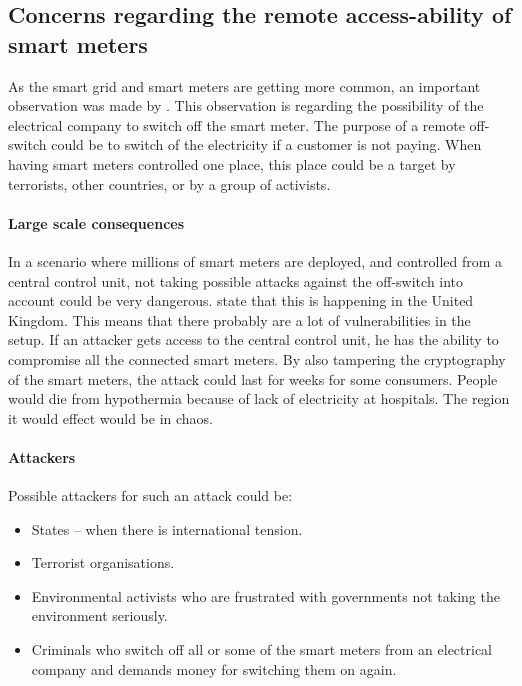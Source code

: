 
\subsection{Concerns regarding the remote access-ability of smart meters}\label{off_switch}
As the smart grid and smart meters are getting more common, an important observation was made by \citet{offswitch}.
This observation is regarding the possibility of the electrical company to switch off the smart meter.
The purpose of a remote off-switch could be to switch of the electricity if a customer is not paying.
When having smart meters controlled one place, this place could be a target by terrorists, other countries, or by a group of activists. 

\paragraph{Large scale consequences}
In a scenario where millions of smart meters are deployed, and controlled from a central control unit, not taking possible attacks against the off-switch into account could be very dangerous.
\citet{offswitch} state that this is happening in the United Kingdom.
This means that there probably are a lot of vulnerabilities in the setup.
If an attacker gets access to the central control unit, he has the ability to compromise all the connected smart meters.
By also tampering the cryptography of the smart meters, the attack could last for weeks for some consumers.
People would die from hypothermia because of lack of electricity at hospitals.
The region it would effect would be in chaos.

\paragraph{Attackers}
Possible attackers for such an attack could be:
\begin{itemize}
\item States -- when there is international tension.
\item Terrorist organisations.
\item Environmental activists who are frustrated with governments not taking the environment seriously.
\item Criminals who switch off all or some of the smart meters from an electrical company and demands money for switching them on again.
\end{itemize}
